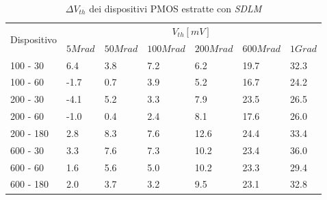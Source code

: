 \documentclass[12pt, letterpaper]{book}
\begin{document}
\begin{table}[H]
  \renewcommand{\arraystretch}{1.3}
  \begin{tabular}{m{2cm}  m{1.1cm} m{1.3cm} m{1.5cm} m{1.5cm} m{1.5cm} m{1cm}}
    \toprule
    \multirow{2}{*}{Dispositivo} & \multicolumn{6}{c}{$V_{th} [mV] $}                                                          \\
    \cmidrule{2-7}
                                 & $5Mrad$                            & $50Mrad$ & $100Mrad$ & $200Mrad$ & $600Mrad$ & $1Grad$ \\
    \midrule
    100 - 30                     & 6.4                                & 3.8      & 7.2       & 6.2       & 19.7      & 32.3    \\
    \hline
    100 - 60                     & -1.7                               & 0.7      & 3.9       & 5.2       & 16.7      & 24.2    \\
    \hline
    200 - 30                     & -4.1                               & 5.2      & 3.3       & 7.9       & 23.5      & 26.5    \\
    \hline
    200 - 60                     & -1.0                               & 0.4      & 2.4       & 8.1       & 17.6      & 26.0    \\
    \hline
    200 - 180                    & 2.8                                & 8.3      & 7.6       & 12.6      & 24.4      & 33.4    \\
    \hline
    600 - 30                     & 3.3                                & 7.6      & 7.3       & 10.2      & 23.4      & 36.0    \\
    \hline
    600 - 60                     & 1.6                                & 5.6      & 5.0       & 10.2      & 23.3      & 29.4    \\
    \hline
    600 - 180                    & 2.0                                & 3.7      & 3.2       & 9.5       & 23.1      & 32.8    \\
    \bottomrule
  \end{tabular}
  \caption{$\Delta V_{th}$ dei dispositivi PMOS estratte con \emph{SDLM}}
  \label{tab:deltaVthSDLMP}
\end{table}
\end{document}
